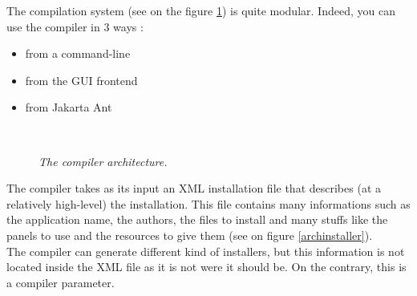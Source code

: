 The compilation system (see on the figure \ref{comparch}) is quite modular. 
Indeed, you can use the compiler in 3 ways :
\begin{itemize}
	\item from a command-line
	\item from the GUI frontend
	\item from Jakarta Ant
\end{itemize}\

\begin{figure}[h]
\caption{\label{comparch}
         \textit{The compiler architecture.}}
\begin{center}
\end{center}
\end{figure}

The compiler takes as its input an XML installation file that describes (at a
relatively high-level) the installation. This file contains many informations
such as the application name, the authors, the files to install and many stuffs
like the panels to use and the resources to give them (see on figure
\ref{archinstaller}).\\

The compiler can generate different kind of installers, but this information is
not located inside the XML file as it is not were it should be. On the contrary,
this is a compiler parameter.\\


